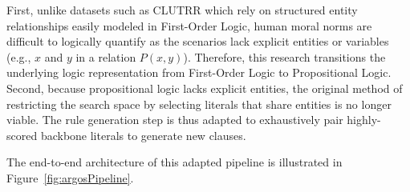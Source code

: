 First, unlike datasets such as CLUTRR which rely on structured entity relationships easily modeled in First-Order Logic, human moral norms are difficult to logically quantify as the scenarios lack explicit entities or variables (e.g., $x$ and $y$ in a relation $P(x,y)$). Therefore, this research transitions the underlying logic representation from First-Order Logic to Propositional Logic. Second, because propositional logic lacks explicit entities, the original method of restricting the search space by selecting literals that share entities is no longer viable. The rule generation step is thus adapted to exhaustively pair highly-scored backbone literals to generate new clauses.

The end-to-end architecture of this adapted pipeline is illustrated in Figure~\ref{fig:argosPipeline}.

